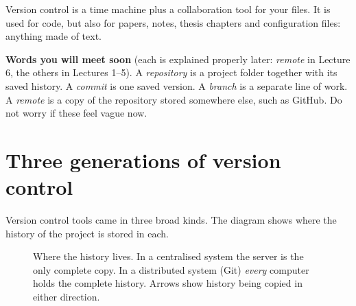 \begin{keyidea}
Version control is a time machine plus a collaboration tool for your files. It is used for code, but also for papers, notes, thesis chapters and configuration files: anything made of text.
\end{keyidea}

\begin{quickfact}
\textbf{Words you will meet soon} (each is explained properly later: \emph{remote} in Lecture 6, the others in Lectures 1--5). A \emph{repository} is a project folder together with its saved history. A \emph{commit} is one saved version. A \emph{branch} is a separate line of work. A \emph{remote} is a copy of the repository stored somewhere else, such as GitHub. Do not worry if these feel vague now.
\end{quickfact}

\section{Three generations of version control}

Version control tools came in three broad kinds. The diagram shows where the history of the project is stored in each.

\begin{figure}[H]
\centering
{}
\caption{Where the history lives. In a centralised system the server is the only complete copy. In a distributed system (Git) \emph{every} computer holds the complete history. Arrows show history being copied in either direction.}
\label{fig:vcs3}
\end{figure}


